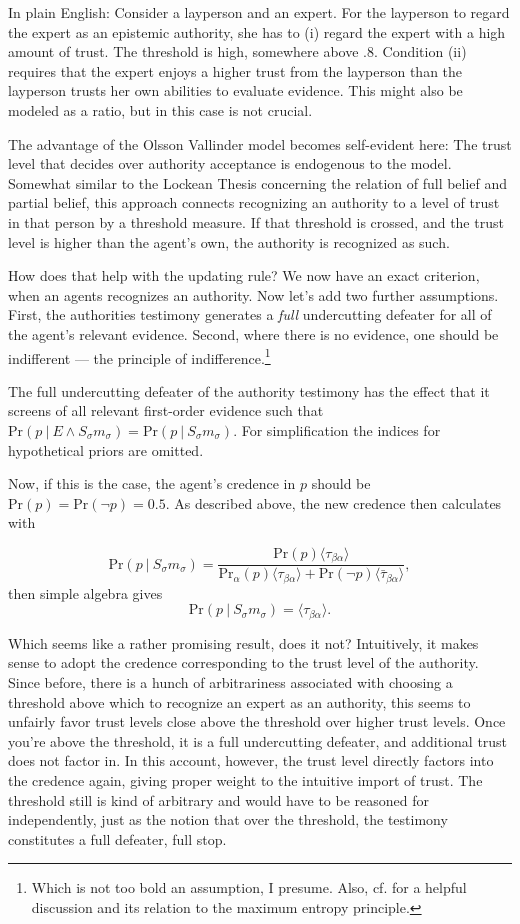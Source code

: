 \documentclass[11pt, a4paper]{scrartcl}
\newcommand{\Ss}{S_{\sigma}}
\newcommand{\given}[1][]{\:#1\vert\:}
\newcommand{\Sm}{\Ss{}m_\sigma}
\renewcommand{\Pr}{\text{Pr}}
\renewcommand{\i}[1]{\emph{#1}}
\renewcommand{\a}{\alpha}
\begin{document}
In plain English: Consider a layperson and an expert. For the layperson to regard the expert as an epistemic authority, she has to (i) regard the expert with a high amount of trust. The threshold is high, somewhere above $.8$. Condition (ii) requires that the expert enjoys a higher trust from the layperson than the layperson trusts her own abilities to evaluate evidence. This might also be modeled as a ratio, but in this case is not crucial.

The advantage of the Olsson Vallinder model becomes self-evident here: The trust level that decides over authority acceptance is endogenous to the model. Somewhat similar to the Lockean Thesis concerning the relation of full belief and partial belief, this approach connects recognizing an authority to a level of trust in that person by a threshold measure. If that threshold is crossed, and the trust level is higher than the agent's own, the authority is recognized as such. 

How does that help with the updating rule? We now have an exact criterion, when an agents recognizes an authority. Now let's add two further assumptions. First, the  authorities testimony generates a \i{full} undercutting defeater for all of the agent's relevant evidence. Second, where there is no evidence, one should be indifferent --- the principle of indifference.\footnote{Which is not too bold an assumption, I presume. Also, cf. \textcite[Ch. 5.3]{Titelbaum2017} for a helpful discussion and its relation to the maximum entropy principle.}   

The full undercutting defeater of the authority testimony has the effect that it screens of all relevant first-order evidence such that $\Pr(p \given E \land \Sm) = \Pr(p \given \Sm)$. For simplification the indices for hypothetical priors are omitted.

Now, if this is the case, the agent's credence in $p$ should be $\Pr(p) = \Pr(\neg p) = 0.5$. As described above, the new credence then calculates with 

\[
    \Pr(p \given \Sm) = \frac{\Pr(p) \langle \tau_{\beta\a} \rangle}
    {\Pr_\a(p) \langle \tau_{\beta\a} \rangle + \Pr(\neg p) \langle \bar{\tau}_{\beta\a} \rangle},
\]
then simple algebra gives 
\[
    \Pr(p \given \Sm ) = \langle \tau_{\beta\a} \rangle.
\]

Which seems like a rather promising result, does it not? Intuitively, it makes sense to adopt the credence corresponding to the trust level of the authority. Since before, there is a hunch of arbitrariness associated with  choosing a threshold above which to recognize an expert as an authority, this seems to unfairly favor trust levels close above the threshold over higher trust levels. Once you're above the threshold, it is a full undercutting defeater, and additional trust does not factor in. In this account, however, the trust level directly factors into the credence again, giving proper weight to the intuitive import of trust. The threshold still is kind of arbitrary and would have to be reasoned for independently, just as the notion that over the threshold, the testimony constitutes a full defeater, full stop.
\end{document}
